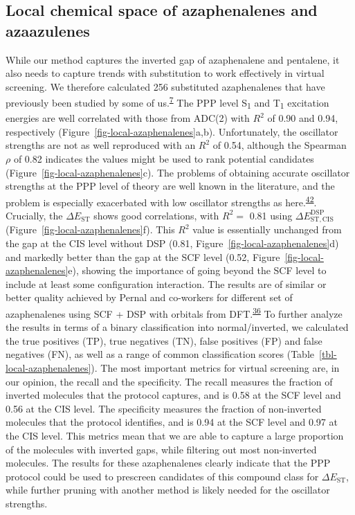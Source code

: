 \documentclass[
  number,
  3p]{elsarticle}
\newcommand{\DeltaE}[2][]{\Delta E^{\mathrm{#1}}_{\mathrm{#2}}}
\newcommand{\DeltaEST}[2][]{\Delta E^{\mathrm{#1}}_{\mathrm{ST,#2}}}
\begin{document}
\hypertarget{local-chemical-space-of-azaphenalenes-and-azaazulenes}{%
\subsection{Local chemical space of azaphenalenes and
azaazulenes}\label{local-chemical-space-of-azaphenalenes-and-azaazulenes}}

While our method captures the inverted gap of azaphenalene and
pentalene, it also needs to capture trends with substitution to work
effectively in virtual screening. We therefore calculated 256
substituted azaphenalenes that have previously been studied by some of
us.\textsuperscript{\protect\hyperlink{ref-polliceOrganicMoleculesInverted2021}{7}}
The PPP level S\textsubscript{1} and T\textsubscript{1} excitation
energies are well correlated with those from ADC(2) with \(R^2\) of 0.90
and 0.94, respectively (Figure~\ref{fig-local-azaphenalenes}a,b).
Unfortunately, the oscillator strengths are not as well reproduced with
an \(R^2\) of 0.54, although the Spearman \(\rho\) of 0.82 indicates the
values might be used to rank potential candidates
(Figure~\ref{fig-local-azaphenalenes}c). The problems of obtaining
accurate oscillator strengths at the PPP level of theory are well known
in the literature, and the problem is especially exacerbated with low
oscillator strengths as
here.\textsuperscript{\protect\hyperlink{ref-misurkinElectronicStructureConjugated1974}{42}}.
Crucially, the \(\DeltaE{ST}\) shows good correlations, with \(R^2=\)
0.81 using \(\DeltaEST[DSP]{CIS}\)
(Figure~\ref{fig-local-azaphenalenes}f). This \(R^2\) value is
essentially unchanged from the gap at the CIS level without DSP (0.81,
Figure~\ref{fig-local-azaphenalenes}d) and markedly better than the gap
at the SCF level (0.52, Figure~\ref{fig-local-azaphenalenes}e), showing
the importance of going beyond the SCF level to include at least some
configuration interaction. The results are of similar or better quality
achieved by Pernal and co-workers for different set of azaphenalenes
using SCF + DSP with orbitals from
DFT.\textsuperscript{\protect\hyperlink{ref-drwalRoleSpinPolarization2023}{36}}
To further analyze the results in terms of a binary classification into
normal/inverted, we calculated the true positives (TP), true negatives
(TN), false positives (FP) and false negatives (FN), as well as a range
of common classification scores (Table~\ref{tbl-local-azaphenalenes}).
The most important metrics for virtual screening are, in our opinion,
the recall and the specificity. The recall measures the fraction of
inverted molecules that the protocol captures, and is 0.58 at the SCF
level and 0.56 at the CIS level. The specificity measures the fraction
of non-inverted molecules that the protocol identifies, and is 0.94 at
the SCF level and 0.97 at the CIS level. This metrics mean that we are
able to capture a large proportion of the molecules with inverted gaps,
while filtering out most non-inverted molecules. The results for these
azaphenalenes clearly indicate that the PPP protocol could be used to
prescreen candidates of this compound class for \(\DeltaE{ST}\), while
further pruning with another method is likely needed for the oscillator
strengths.
\end{document}
